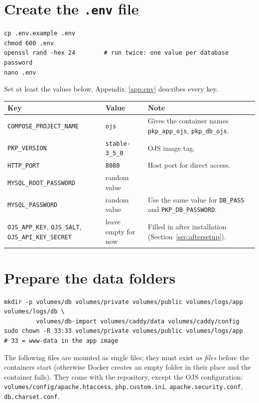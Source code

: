 \documentclass[11pt,a4paper]{report}
\newcommand{\code}[1]{\texttt{\small #1}}
\newcommand{\file}[1]{\texttt{\small #1}}
\begin{document}
\section{Create the \texorpdfstring{\texttt{.env}}{.env} file}
\begin{lstlisting}
cp .env.example .env
chmod 600 .env
openssl rand -hex 24        # run twice: one value per database password
nano .env
\end{lstlisting}
Set at least the values below. Appendix~\ref{app:env} describes every key.
\begin{tabularx}{\linewidth}{@{}P{4.6cm}P{4.4cm}L@{}}
\toprule
\textbf{Key} & \textbf{Value} & \textbf{Note} \\
\midrule
\code{COMPOSE\_PROJECT\_NAME} & \code{ojs}            & Gives the container names \code{pkp\_app\_ojs}, \code{pkp\_db\_ojs}. \\
\code{PKP\_VERSION}           & \code{stable-3\_5\_0} & OJS image tag. \\
\code{HTTP\_PORT}             & \code{8080}           & Host port for direct access. \\
\code{MYSQL\_ROOT\_PASSWORD}  & random value          & \\
\code{MYSQL\_PASSWORD}        & random value          & Use the same value for \code{DB\_PASS} and \code{PKP\_DB\_PASSWORD}. \\
\code{OJS\_APP\_KEY}, \code{OJS\_SALT}, \code{OJS\_API\_KEY\_SECRET} & leave empty for now & Filled in after installation (Section~\ref{sec:aftersetup}). \\
\bottomrule
\end{tabularx}

\section{Prepare the data folders}
\begin{lstlisting}
mkdir -p volumes/db volumes/private volumes/public volumes/logs/app volumes/logs/db \
         volumes/db-import volumes/caddy/data volumes/caddy/config
sudo chown -R 33:33 volumes/private volumes/public volumes/logs/app   # 33 = www-data in the app image
\end{lstlisting}

The following files are mounted as single files; they must exist \emph{as files} before the
containers start (otherwise Docker creates an empty folder in their place and the container
fails). They come with the repository, except the OJS configuration:
\file{volumes/config/apache.htaccess}, \file{php.custom.ini}, \file{apache.security.conf},
\file{db.charset.conf}.
\end{document}
